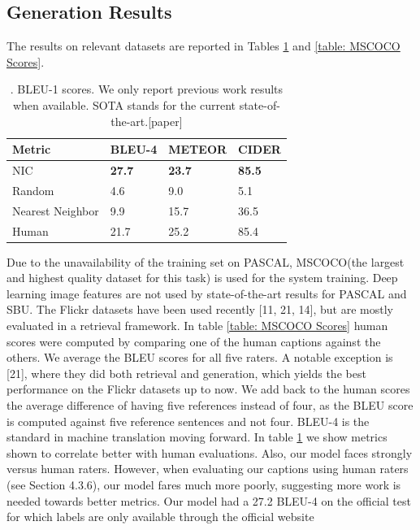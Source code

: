 \documentclass[a4paper,UKenglish,cleveref, autoref, thm-restate]{lipics-v2021}
\begin{document}
\subsection{Generation Results}
The results on relevant datasets are reported in Tables \ref{table: BLEU-1} and \ref{table: MSCOCO Scores}.
\begin{table}
\centering
\begin{tabular}{ |p{3cm}||p{2cm}|p{2cm}|p{2cm}|}
    \hline
     \centering
     Metric & BLEU-4 & METEOR & CIDER  \\
     \hline
     \hline
     NIC & \textbf{27.7} &  \textbf{23.7}  & \textbf{85.5}  \\
     \hline
     Random   &  4.6  & 9.0 & 5.1   \\
     Nearest Neighbor     &  9.9  & 15.7 & 36.5  \\
     Human  &  21.7  & 25.2   &  85.4  \\
     \hline
\end{tabular}
\caption{. BLEU-1 scores. We only report previous work results
when available. SOTA stands for the current state-of-the-art.[paper]}
\label{table: BLEU-1}
\end {table}
Due to the unavailability of the training set on PASCAL, MSCOCO(the largest and highest quality dataset for this task) is used for the system training.
Deep learning image features are not used by state-of-the-art results for PASCAL and SBU.
The Flickr datasets have been used recently [11, 21, 14], but are mostly evaluated in a retrieval framework.
In table \ref{table: MSCOCO Scores} human scores were computed by comparing one of the human captions against the others. We average the BLEU scores for all five raters.
 A notable exception is [21], where they did both retrieval and generation, which yields the best performance on the Flickr datasets up to now. We add back to the human scores the average difference of having five references instead of four, as the BLEU score is computed against five reference sentences and not four. BLEU-4 is the standard in machine translation moving forward.
In table \ref{table: BLEU-1} we show metrics shown to correlate better with human evaluations. Also, our model faces strongly versus human raters. However, when evaluating our captions using human raters (see Section 4.3.6), our model fares much more poorly, suggesting more work is needed towards better metrics. Our model had a 27.2 BLEU-4 on the official test for which labels are only available through the official website
\end{document}
